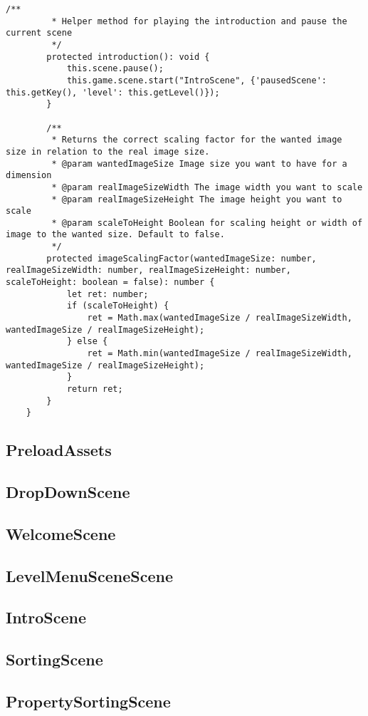 \begin{lstlisting}[style=TypeScript, caption=BaseScene.ts]
        /**
         * Helper method for playing the introduction and pause the current scene
         */
        protected introduction(): void {
            this.scene.pause();
            this.game.scene.start("IntroScene", {'pausedScene': this.getKey(), 'level': this.getLevel()});
        }

        /**
         * Returns the correct scaling factor for the wanted image size in relation to the real image size.
         * @param wantedImageSize Image size you want to have for a dimension
         * @param realImageSizeWidth The image width you want to scale
         * @param realImageSizeHeight The image height you want to scale
         * @param scaleToHeight Boolean for scaling height or width of image to the wanted size. Default to false.
         */
        protected imageScalingFactor(wantedImageSize: number, realImageSizeWidth: number, realImageSizeHeight: number, scaleToHeight: boolean = false): number {
            let ret: number;
            if (scaleToHeight) {
                ret = Math.max(wantedImageSize / realImageSizeWidth, wantedImageSize / realImageSizeHeight);
            } else {
                ret = Math.min(wantedImageSize / realImageSizeWidth, wantedImageSize / realImageSizeHeight);
            }
            return ret;
        }
    }
\end{lstlisting}

\subsection{PreloadAssets}
\subsection{DropDownScene}
\subsection{WelcomeScene}
\subsection{LevelMenuSceneScene}
\subsection{IntroScene}
\subsection{SortingScene}
\subsection{PropertySortingScene}
